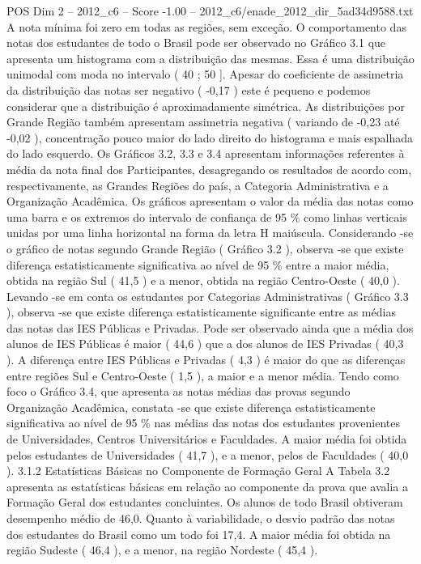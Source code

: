 \begin{textsample}{POS Dim 2 – 2012\_c6 – Score -1.00 – 2012\_c6/enade\_2012\_dir\_5ad34d9588.txt}
A nota mínima foi zero em todas as regiões, sem exceção.
O comportamento das notas dos estudantes de todo o Brasil pode ser observado no Gráfico 3.1 que apresenta um histograma com a distribuição das mesmas.
Essa é uma distribuição unimodal com moda no intervalo ( 40 ; 50 ].
Apesar do coeficiente de assimetria da distribuição das notas ser negativo ( -0,17 ) este é pequeno e podemos considerar que a distribuição é aproximadamente simétrica.
As distribuições por Grande Região também apresentam assimetria negativa ( variando de -0,23 até -0,02 ), concentração pouco maior do lado direito do histograma e mais espalhada do lado esquerdo.
Os Gráficos 3.2, 3.3 e 3.4 apresentam informações referentes à média da nota final dos Participantes, desagregando os resultados de acordo com, respectivamente, as Grandes Regiões do país, a Categoria Administrativa e a Organização Acadêmica.
Os gráficos apresentam o valor da média das notas como uma barra e os extremos do intervalo de confiança de 95 \% como linhas verticais unidas por uma linha horizontal na forma da letra H maiúscula.
Considerando -se o gráfico de notas segundo Grande Região ( Gráfico 3.2 ), observa -se que existe diferença estatisticamente significativa ao nível de 95 \% entre a maior média, obtida na região Sul ( 41,5 ) e a menor, obtida na região Centro-Oeste ( 40,0 ).
Levando -se em conta os estudantes por Categorias Administrativas ( Gráfico 3.3 ), observa -se que existe diferença estatisticamente significante entre as médias das notas das IES Públicas e Privadas.
Pode ser observado ainda que a média dos alunos de IES Públicas é maior ( 44,6 ) que a dos alunos de IES Privadas ( 40,3 ).
A diferença entre IES Públicas e Privadas ( 4,3 ) é maior do que as diferenças entre regiões Sul e Centro-Oeste ( 1,5 ), a maior e a menor média.
Tendo como foco o Gráfico 3.4, que apresenta as notas médias das provas segundo Organização Acadêmica, constata -se que existe diferença estatisticamente significativa ao nível de 95 \% nas médias das notas dos estudantes provenientes de Universidades, Centros Universitários e Faculdades.
A maior média foi obtida pelos estudantes de Universidades ( 41,7 ), e a menor, pelos de Faculdades ( 40,0 ). 3.1.2 Estatísticas Básicas no Componente de Formação Geral A Tabela 3.2 apresenta as estatísticas básicas em relação ao componente da prova que avalia a Formação Geral dos estudantes concluintes.
Os alunos de todo Brasil obtiveram desempenho médio de 46,0.
Quanto à variabilidade, o desvio padrão das notas dos estudantes do Brasil como um todo foi 17,4.
A maior média foi obtida na região Sudeste ( 46,4 ), e a menor, na região Nordeste ( 45,4 ).

\end{textsample}
